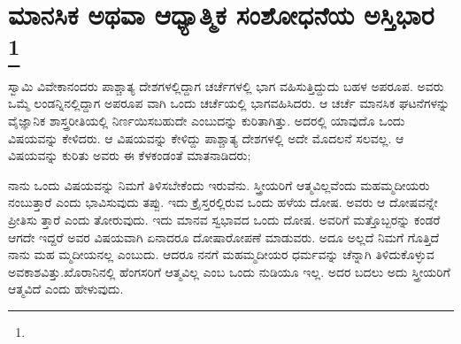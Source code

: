 
\chapter[ಮಾನಸಿಕ ಅಥವಾ ಆಧ್ಯಾತ್ಮಿಕ ಸಂಶೋಧನೆಯ ಅಸ್ತಿಭಾರ ]{ಮಾನಸಿಕ ಅಥವಾ ಆಧ್ಯಾತ್ಮಿಕ ಸಂಶೋಧನೆಯ ಅಸ್ತಿಭಾರ \protect\footnote{}}

ಸ್ವಾಮಿ ವಿವೇಕಾನಂದರು ಪಾಶ್ಚಾತ್ಯ ದೇಶಗಳಲ್ಲಿದ್ದಾಗ ಚರ್ಚೆಗಳಲ್ಲಿ ಭಾಗ ವಹಿಸುತ್ತಿದ್ದುದು ಬಹಳ ಅಪರೂಪ. ಅವರು ಒಮ್ಮೆ ಲಂಡನ್ನಿನಲ್ಲಿದ್ದಾಗ ಅಪರೂಪ ವಾಗಿ ಒಂದು ಚರ್ಚೆಯಲ್ಲಿ ಭಾಗವಹಿಸಿದರು. ಆ ಚರ್ಚೆ ಮಾನಸಿಕ ಘಟನೆಗಳನ್ನು ವೈಜ್ಞಾನಿಕ ಶಾಸ್ತ್ರರೀತಿಯಲ್ಲಿ ನಿರ್ಣಯಿಸಬಹುದೇ ಎಂಬುದನ್ನು ಕುರಿತಾಗಿತ್ತು. ಅದರಲ್ಲಿ ಯಾವುದೊ ಒಂದು ವಿಷಯವನ್ನು ಕೇಳಿದರು. ಆ ವಿಷಯವನ್ನು ಕೇಳಿದ್ದು ಪಾಶ್ಚಾತ್ಯ ದೇಶಗಳಲ್ಲಿ ಅದೇ ಮೊದಲನೆ ಸಲವಲ್ಲ. ಆ ವಿಷಯವನ್ನು ಕುರಿತು ಅವರು ಈ ಕೆಳಕಂಡಂತೆ ಮಾತನಾಡಿದರು;

ನಾನು ಒಂದು ವಿಷಯವನ್ನು ನಿಮಗೆ ತಿಳಿಸಬೇಕೆಂದು ಇರುವೆನು. ಸ್ತ್ರೀಯರಿಗೆ ಆತ್ಮವಿಲ್ಲವೆಂದು ಮಹಮ್ಮದೀಯರು ನಂಬುತ್ತಾರೆ ಎಂದು ಭಾವಿಸುವುದು ತಪ್ಪು. ಇದು ಕ್ರೈಸ್ತರಲ್ಲಿರುವ ಒಂದು ಹಳೆಯ ದೋಷ. ಅವರು ಆ ದೋಷವನ್ನೇ ಪ್ರೀತಿಸು ತ್ತಾರೆ ಎಂದು ತೋರುವುದು. ಇದು ಮಾನವ ಸ್ವಭಾವದ ಒಂದು ದೋಷ. ಅವರಿಗೆ ಮತ್ತೊಬ್ಬರನ್ನು ಕಂಡರೆ ಆಗದೇ ಇದ್ದರೆ ಅವರ ವಿಷಯವಾಗಿ ಏನಾದರೂ ದೋಷಾರೋಪಣೆ ಮಾಡುವರು. ಅದೂ ಅಲ್ಲದೆ ನಿಮಗೆ ಗೊತ್ತಿದೆ ನಾನು ಮಹ ಮ್ಮದೀಯನಲ್ಲ ಎಂಬುದು. ಆದರೂ ನನಗೆ ಮಹಮ್ಮದೀಯರ ಧರ್ಮವನ್ನು ಚೆನ್ನಾಗಿ ತಿಳಿದುಕೊಳ್ಳುವ ಅವಕಾಶವಿತ್ತು.ಖೊರಾನಿನಲ್ಲಿ ಹೆಂಗಸರಿಗೆ ಆತ್ಮವಿಲ್ಲ ಎಂಬ ಒಂದು ನುಡಿಯೂ ಇಲ್ಲ. ಅದರ ಬದಲು ಅದು ಸ್ತ್ರೀಯರಿಗೆ ಆತ್ಮವಿದೆ ಎಂದು ಹೇಳುವುದು.

